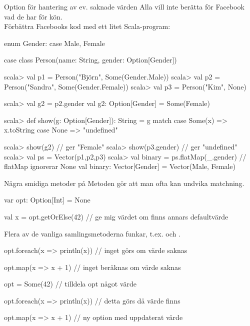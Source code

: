 \begin{Slide}{Option för hantering av ev. saknade värden}\SlideFontTiny
Alla vill inte berätta för Facebook vad de har för kön. \\ Förbättra Facebooks kod med ett litet Scala-program:
\begin{CodeSmall}
enum Gender:
  case Male, Female

case class Person(name: String, gender: Option[Gender])
\end{CodeSmall}
\pause
\begin{REPLsmall}
scala> val p1 = Person("Björn",  Some(Gender.Male))
scala> val p2 = Person("Sandra", Some(Gender.Female))
scala> val p3 = Person("Kim",  None)

scala> val g2 = p2.gender
val g2: Option[Gender] = Some(Female)

scala> def show(g: Option[Gender]): String = g match 
         case Some(x) => x.toString
         case None    => "undefined"

scala> show(g2)                              // ger "Female"
scala> show(p3.gender)                       // ger "undefined"
scala> val ps = Vector(p1,p2,p3)
scala> val binary = ps.flatMap(_.gender)     // flatMap ignorerar None
val binary: Vector[Gender] = Vector(Male, Female)
\end{REPLsmall}
\end{Slide}

\begin{Slide}{Några smidiga metoder på }\SlideFontSmall
Metoden  gör att man ofta kan undvika matchning.
\begin{Code}
var opt: Option[Int] = None

val x = opt.getOrElse(42)   // ge mig värdet om finns annars defaultvärde 
\end{Code}

Flera av de vanliga samlingsmetoderna funkar, t.ex.  och .
\begin{Code}
opt.foreach(x => println(x)) // inget görs om värde saknas

opt.map(x => x + 1)          // inget beräknas om värde saknas

opt = Some(42)               // tilldela opt något värde

opt.foreach(x => println(x)) // detta görs då värde finns

opt.map(x => x + 1)          // ny option med uppdaterat värde

\end{Code}
\end{Slide}


